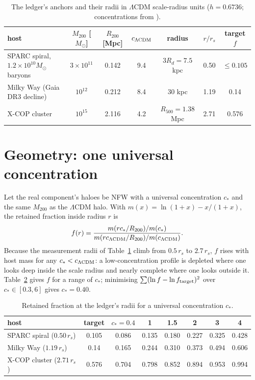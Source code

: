 \documentclass[11pt,letterpaper]{article}
\begin{document}
\begin{table}[h]\centering\caption{The ledger's anchors and their radii in $\Lambda$CDM scale-radius units ($h=0.6736$; concentrations from \cite{dm14}).}\label{anchors}
\begin{tabular}{lcccccc}\toprule
host & $M_{200}$ [$M_\odot$] & $R_{200}$ [Mpc] & $c_{\Lambda{\rm CDM}}$ & radius & $r/r_s$ & target $f$\\\midrule
SPARC spiral, $1.2\times10^{10}M_\odot$ baryons & $3\times10^{11}$ & 0.142 & 9.4 & $3R_d=7.5$ kpc & 0.50 & $\le0.105$\\
Milky Way (Gaia DR3 decline) & $10^{12}$ & 0.212 & 8.4 & 30 kpc & 1.19 & 0.14\\
X-COP cluster & $10^{15}$ & 2.116 & 4.2 & $R_{500}=1.38$ Mpc & 2.71 & 0.576\\\bottomrule
\end{tabular}\end{table}

\section{Geometry: one universal concentration}
Let the real component's haloes be NFW \cite{nfw} with a universal concentration $c_*$ and the same $M_{200}$ as the $\Lambda$CDM halo. With $m(x)=\ln(1+x)-x/(1+x)$, the retained fraction inside radius $r$ is
\begin{equation}
f(r)=\frac{m(rc_*/R_{200})/m(c_*)}{m(rc_{\Lambda{\rm CDM}}/R_{200})/m(c_{\Lambda{\rm CDM}})}.
\end{equation}
Because the measurement radii of Table~\ref{anchors} climb from $0.5\,r_s$ to $2.7\,r_s$, $f$ rises with host mass for any $c_*<c_{\Lambda{\rm CDM}}$: a low-concentration profile is depleted where one looks deep inside the scale radius and nearly complete where one looks outside it. Table~\ref{geom} gives $f$ for a range of $c_*$; minimising $\sum(\ln f-\ln f_{\rm target})^2$ over $c_*\in[0.3,6]$ gives $c_*=0.40$.

\begin{table}[h]\centering\caption{Retained fraction at the ledger's radii for a universal concentration $c_*$.}\label{geom}
\begin{tabular}{lccccccc}\toprule
host & target & $c_*=0.4$ & 1 & 1.5 & 2 & 3 & 4\\\midrule
SPARC spiral ($0.50\,r_s$) & 0.105 & 0.086 & 0.135 & 0.180 & 0.227 & 0.325 & 0.428\\
Milky Way ($1.19\,r_s$) & 0.14 & 0.165 & 0.244 & 0.310 & 0.373 & 0.494 & 0.606\\
X-COP cluster ($2.71\,r_s$) & 0.576 & 0.704 & 0.798 & 0.852 & 0.894 & 0.953 & 0.994\\\bottomrule
\end{tabular}\end{table}
\end{document}
